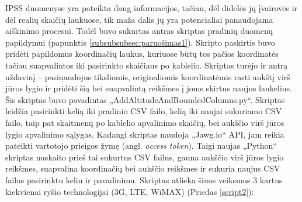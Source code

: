 \documentclass{VUMIFPSbakalaurinis}
\begin{document}
 \label{subsubsubsec:paruošimas2}
IPSS duomenyse yra pateikta daug informacijos, tačiau, dėl didelės jų įvairovės ir dėl realių skaičių laukuose, tik maža dalis jų yra potencialiai panaudojama aiškinimo procesui. Todėl buvo sukurtas antras skriptas pradinių duomenų papildymui  (papunktis \ref{subsubsubsec:paruošimas1}). Skripto paskirtis buvo pridėti papildomus koordinačių laukus, kuriuose būtų tos pačios koordinatės tačiau suapvalintos iki pasirinkto skaičiaus po kablelio. Skriptas turėjo ir antrą uždavinį – pasinaudojus tiksliomis, originaliomis koordinatėmis rasti aukštį virš jūros lygio ir pridėti šią bei suapvalintą reikšmes į joms skirtus naujus laukelius. Šis skriptas buvo pavadintas „AddAltitudeAndRoundedColumns.py“. Skriptas leidžia pasirinkti kelią iki pradinio CSV failo, kelią iki naujai sukuriamo CSV failo, taip pat skaitmenų po kablelio apvalinimo skaičių, bei aukščio virš jūros lygio apvalinimo sąlygas. Kadangi skriptas naudoja „Jawg.io“ API, jam reikia pateikti vartotojo prieigos žymę (angl. \textit{access token}). Taigi naujas „Python“ skriptas nuskaito prieš tai sukurtus CSV failus, gauna aukščio virš jūros lygio reikšmes, suapvalina koordinačių bei aukščio reikšmes ir sukuria naujus CSV failus pasirinktu keliu ir pavadinimu. Skriptas atlieka šiuos veiksmus 3 kartus kiekvienai ryšio technologijai (3G, LTE, WiMAX) (Priedas \ref{script2}):
\end{document}
